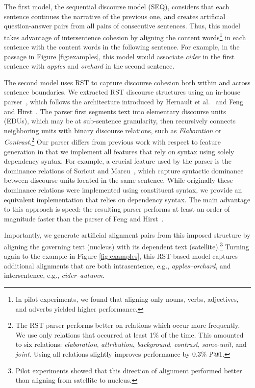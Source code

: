 The first model, the sequential discourse model (SEQ), considers that each sentence continues the narrative  of the previous one, and creates artificial question-answer pairs from all pairs of consecutive sentences.
Thus, this model takes advantage of intersentence cohesion by aligning the content words\footnote{In pilot experiments, we found that aligning only nouns, verbs, adjectives, and adverbs yielded higher performance.} in each sentence with the content words in the following sentence.  For example, in the passage in Figure \ref{fig:examples}, this model would associate \emph{cider} in the first sentence with \emph{apples} and \emph{orchard} in the second sentence.

The second model uses RST to capture discourse cohesion both within and across sentence boundaries.  
We extracted RST discourse structures using an in-house parser~\cite{Surdeanu:15}, which follows the architecture introduced by Hernault et al.~\citeyear{hernault10} and Feng and Hirst~\citeyear{feng12}.
The parser first segments text into elementary discourse units (EDUs), which may be at sub-sentence granularity, then recursively connects neighboring units with binary discourse relations, such as \emph{Elaboration} or \emph{Contrast}.\footnote{The RST parser performs better on relations which occur more frequently.  We use only relations that occurred at least 1\% of the time.  This amounted to six relations: \emph{elaboration}, \emph{attribution}, \emph{background}, \emph{contrast}, \emph{same-unit}, and \emph{joint}. Using all relations slightly improves performance by 0.3\% P@1.} Our parser differs from previous work with respect to feature generation in that we implement all features that rely on syntax using solely dependency syntax. For example, a crucial feature used by the parser is the dominance relations of Soricut and Marcu~\citeyear{soricut2003}, which capture syntactic dominance between discourse units located in the same sentence. While originally these dominance relations were implemented using constituent syntax, we provide an equivalent implementation that relies on dependency syntax. The main advantage to this approach is speed: the resulting parser performs at least an order of magnitude faster than the parser of Feng and Hirst~\citeyear{feng12}. 

Importantly, we generate artificial alignment pairs from this imposed structure by aligning the governing text (nucleus) with its dependent text (satellite).\footnote{Pilot experiments showed that this direction of alignment performed better than aligning from satellite to nucleus.} 
 Turning again to the example in Figure \ref{fig:examples}, this RST-based model captures additional alignments that are both intrasentence, e.g., \emph{apples--orchard}, and intersentence, e.g., {\em cider--autumn}. 

